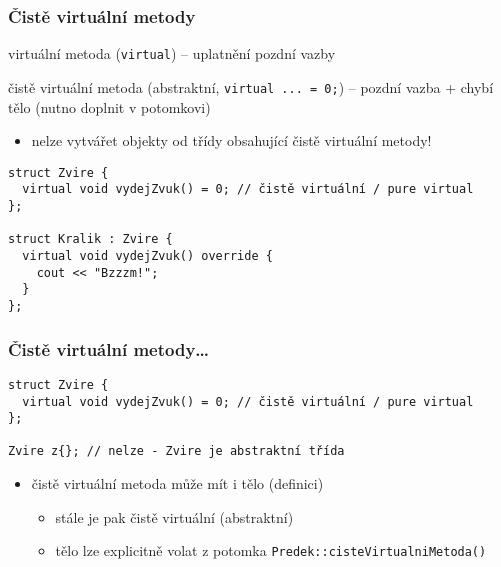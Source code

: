 \begin{frame}[fragile]
\frametitle{Čistě virtuální metody}

\begin{bitemize}
\item virtuální metoda (\lstinline|virtual|) -- uplatnění pozdní vazby
\item čistě virtuální metoda (abstraktní, \lstinline|virtual ... = 0;|) -- pozdní vazba + chybí tělo (nutno doplnit v potomkovi)
\begin{itemize}
\item nelze vytvářet objekty od třídy obsahující čistě virtuální metody!
\end{itemize}
\end{bitemize}


\begin{yesblock}
\begin{lstlisting}
struct Zvire {
  virtual void vydejZvuk() = 0; // čistě virtuální / pure virtual
};

struct Kralik : Zvire {
  virtual void vydejZvuk() override {
    cout << "Bzzzm!";
  }
};

\end{lstlisting}
\end{yesblock}
\end{frame}





\begin{frame}[fragile]
\frametitle{Čistě virtuální metody\ldots}


\begin{noblock}
\begin{lstlisting}
struct Zvire {
  virtual void vydejZvuk() = 0; // čistě virtuální / pure virtual
};

Zvire z{}; // nelze - Zvire je abstraktní třída
\end{lstlisting}
\end{noblock}

\begin{bonusblock}{}
\begin{itemize}
\item čistě virtuální metoda může mít i tělo (definici)
\begin{itemize}
\item stále je pak čistě virtuální (abstraktní)
\item tělo lze explicitně volat z potomka \lstinline|Predek::cisteVirtualniMetoda()|
\end{itemize}
\end{itemize}
\end{bonusblock}
\end{frame}





